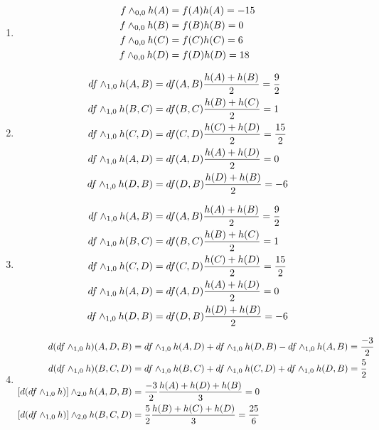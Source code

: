 \documentclass{article}
\begin{document}
\vspace{1.8cm}
\\\\

\begin{enumerate}[label=(\alph*)]
    \item 
    \begin{align}
        f \wedge_{0, 0} h(A) &= f(A)h(A) = -15 \notag\\
        f \wedge_{0, 0} h(B) &= f(B)h(B) = 0 \notag\\
        f \wedge_{0, 0} h(C) &= f(C)h(C) = 6 \notag\\
        f \wedge_{0, 0} h(D) &= f(D)h(D) = 18 \notag
    \end{align}

    \item 
    \begin{align}
        df \wedge_{1, 0} h (A, B) &= df(A, B) \frac{h(A) + h(B)}{2} = \frac92 \notag\\
        df \wedge_{1, 0} h (B, C) &= df(B, C) \frac{h(B) + h(C)}{2} = 1 \notag\\
        df \wedge_{1, 0} h (C, D) &= df(C, D) \frac{h(C) + h(D)}{2} = \frac{15}{2} \notag\\
        df \wedge_{1, 0} h (A, D) &= df(A, D) \frac{h(A) + h(D)}{2} = 0 \notag\\
        df \wedge_{1, 0} h (D, B) &= df(D, B) \frac{h(D) + h(B)}{2} = -6 \notag
    \end{align}

    \item 
    \begin{align}
        df \wedge_{1, 0} h (A, B) &= df(A, B) \frac{h(A) + h(B)}{2} = \frac92 \notag\\
        df \wedge_{1, 0} h (B, C) &= df(B, C) \frac{h(B) + h(C)}{2} = 1 \notag\\
        df \wedge_{1, 0} h (C, D) &= df(C, D) \frac{h(C) + h(D)}{2} = \frac{15}{2} \notag\\
        df \wedge_{1, 0} h (A, D) &= df(A, D) \frac{h(A) + h(D)}{2} = 0 \notag\\
        df \wedge_{1, 0} h (D, B) &= df(D, B) \frac{h(D) + h(B)}{2} = -6 \notag
    \end{align}

    \item 
    \begin{align}
        d(df \wedge_{1, 0} h) (A, D, B) &= df \wedge_{1, 0} h (A, D) + df \wedge_{1, 0} h (D, B) - df \wedge_{1, 0} h (A, B) = \frac{-3}{2} \notag\\
        d(df \wedge_{1, 0} h) (B, C, D) &= df \wedge_{1, 0} h (B, C) + df \wedge_{1, 0} h (C, D) + df \wedge_{1, 0} h (D, B) = \frac{5}{2} \notag\\
        [d(df \wedge_{1, 0} h)] \wedge_{2, 0} h (A, D, B) &= \frac{-3}{2} \frac{h(A) + h(D) + h(B)}{3} = 0\notag\\
        [d(df \wedge_{1, 0} h)] \wedge_{2, 0} h (B, C, D) &= \frac{5}{2} \frac{h(B) + h(C) + h(D)}{3} = \frac{25}{6}\notag
    \end{align}


\end{enumerate}
\end{document}
